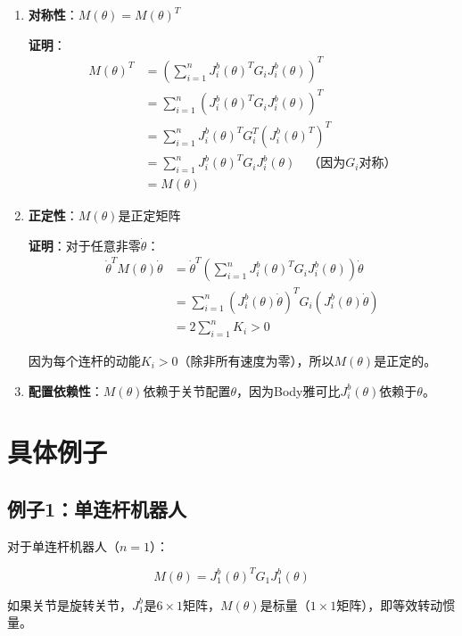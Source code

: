 \documentclass[12pt,a4paper]{article}
\begin{document}
\begin{enumerate}
\item \textbf{对称性}：$M(\theta) = M(\theta)^T$

\textbf{证明}：
\begin{align}
M(\theta)^T &= \left(\sum_{i=1}^{n} J_i^b(\theta)^T G_i J_i^b(\theta)\right)^T \\
&= \sum_{i=1}^{n} (J_i^b(\theta)^T G_i J_i^b(\theta))^T \\
&= \sum_{i=1}^{n} J_i^b(\theta)^T G_i^T (J_i^b(\theta)^T)^T \\
&= \sum_{i=1}^{n} J_i^b(\theta)^T G_i J_i^b(\theta) \quad \text{（因为$G_i$对称）} \\
&= M(\theta)
\end{align}

\item \textbf{正定性}：$M(\theta)$是正定矩阵

\textbf{证明}：对于任意非零$\dot{\theta}$：
\begin{align}
\dot{\theta}^T M(\theta) \dot{\theta} &= \dot{\theta}^T \left(\sum_{i=1}^{n} J_i^b(\theta)^T G_i J_i^b(\theta)\right) \dot{\theta} \\
&= \sum_{i=1}^{n} (J_i^b(\theta) \dot{\theta})^T G_i (J_i^b(\theta) \dot{\theta}) \\
&= 2\sum_{i=1}^{n} K_i > 0
\end{align}

因为每个连杆的动能$K_i > 0$（除非所有速度为零），所以$M(\theta)$是正定的。

\item \textbf{配置依赖性}：$M(\theta)$依赖于关节配置$\theta$，因为Body雅可比$J_i^b(\theta)$依赖于$\theta$。
\end{enumerate}

\section{具体例子}

\subsection{例子1：单连杆机器人}

对于单连杆机器人（$n = 1$）：

\begin{equation}
M(\theta) = J_1^b(\theta)^T G_1 J_1^b(\theta)
\end{equation}

如果关节是旋转关节，$J_1^b$是$6 \times 1$矩阵，$M(\theta)$是标量（$1 \times 1$矩阵），即等效转动惯量。
\end{document}
